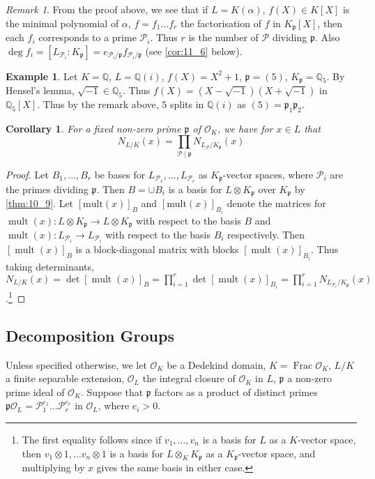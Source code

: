 \documentclass[11pt]{article}
\theoremstyle{definition}
\newtheorem*{example}{Example}
\theoremstyle{plain}
\newtheorem{corollary}[definition]{Corollary}
\theoremstyle{remark}
\newtheorem*{remark}{Remark}
\DeclareMathOperator{\Frac}{Frac}
\DeclareMathOperator{\mult}{mult}
\newcommand{\bQ}{\mathbb{Q}}
\newcommand{\cO}{\mathcal{O}}
\newcommand{\cP}{\mathcal{P}}
\newcommand{\fp}{\mathfrak{p}}
\begin{document}
\begin{remark}
    From the proof above, we see that if $L = K(\alpha)$, $f(X) \in K[X]$ is the minimal polynomial of $\alpha$, $f = f_1 \ldots f_r$ the factorisation of $f$ in $K_\fp[X]$, then each $f_i$ corresponds to a prime $\cP_i$. Thus $r$ is the number of $\cP$ dividing $\fp$. Also $\deg f_i = [L_{\cP_i} : K_\fp] = e_{\cP_i/\fp} f_{\cP_i/\fp}$ (see \autoref{cor:11_6} below).
\end{remark}

\begin{example}
    Let $K = \bQ$, $L = \bQ(i)$, $f(X) = X^2 + 1$, $\fp = (5)$, $K_\fp = \bQ_5$. By Hensel's lemma, $\sqrt{-1} \in \bQ_5$. Thus $f(X) = (X - \sqrt{-1})(X + \sqrt{-1})$ in $\bQ_5[X]$. Thus by the remark above, $5$ splits in $\bQ(i)$ as $(5) = \fp_1 \fp_2$.
\end{example}

\begin{corollary}\label{cor:10_10}
    For a fixed non-zero prime $\fp$ of $\cO_K$, we have for $x \in L$ that
    \begin{equation*}
        N_{L/K}(x) = \prod_{\cP \mid \fp} N_{L_\cP/K_\fp}(x)
    \end{equation*}
\end{corollary}
\begin{proof}
    Let $B_1, \ldots, B_r$ be bases for $L_{\cP_1}, \ldots, L_{\cP_r}$ as $K_\fp$-vector spaces, where $\cP_i$ are the primes dividing $\fp$. Then $B = \cup B_i$ is a basis for $L \otimes K_\fp$ over $K_\fp$ by \autoref{thm:10_9}. Let $[\mathrm{mult}(x)]_B$ and $[\mathrm{mult}(x)]_{B_i}$ denote the matrices for $\mult(x) : L \otimes K_\fp \to L \otimes K_\fp$ with respect to the basis $B$ and $\mult(x) : L_{\cP_i} \to L_{\cP_i}$ with respect to the basis $B_i$ respectively. Then $[\mult(x)]_B$ is a block-diagonal matrix with blocks $[\mult(x)]_{B_i}$. Thus taking determinants, $N_{L/K}(x) = \det [\mult(x)]_B = \prod_{i=1}^r \det [\mult(x)]_{B_i} = \prod_{i=1}^r N_{L_{\cP_i} / K_\fp}(x)$.\footnote{The first equality follows since if $v_1, \ldots, v_n$ is a basis for $L$ as a $K$-vector space, then $v_1 \otimes 1, \ldots v_n \otimes 1$ is a basis for $L \otimes_K K_\fp$ as a $K_\fp$-vector space, and multiplying by $x$ gives the same basis in either case.}
\end{proof}

\subsection{Decomposition Groups}
Unless specified otherwise, we let $\cO_K$ be a Dedekind domain, $K = \Frac{\cO_K}$, $L / K$ a finite separable extension, $\cO_L$ the integral closure of $\cO_K$ in $L$, $\fp$ a non-zero prime ideal of $\cO_K$. Suppose that $\fp$ factors as a product of distinct primes $\fp \cO_L = \cP_1^{e_1} \ldots \cP_r^{e_r}$ in $\cO_L$, where $e_i > 0$.
\end{document}
